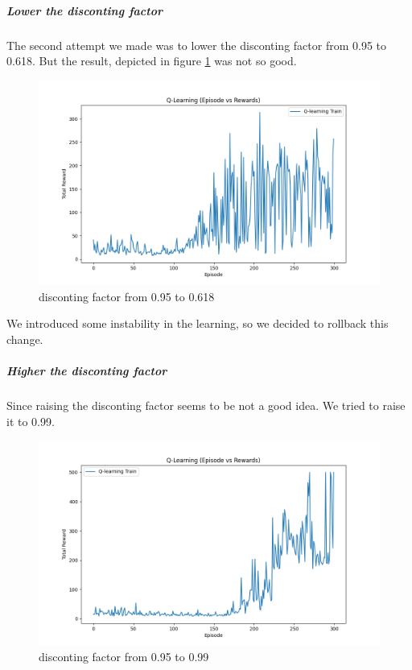 \documentclass{article}
\begin{document}
\subparagraph{Lower the disconting factor}

The second attempt we made was to lower the disconting factor from 0.95 to 0.618.
But the result, depicted in figure \ref{fig:dqn-6} was not so good.

\begin{figure}
  \includegraphics[width=\linewidth]{DQN-0006.png}
  \caption{disconting factor from 0.95 to 0.618}
  \label{fig:dqn-6}
\end{figure}

We introduced some instability in the learning, so we decided to rollback this change.

\subparagraph{Higher the disconting factor}

Since raising the disconting factor seems to be not a good idea. We tried to raise it to 0.99.

\begin{figure}
  \includegraphics[width=\linewidth]{DQN-0007.png}
  \caption{disconting factor from 0.95 to 0.99}
  \label{fig:dqn-7}
\end{figure}
\end{document}
